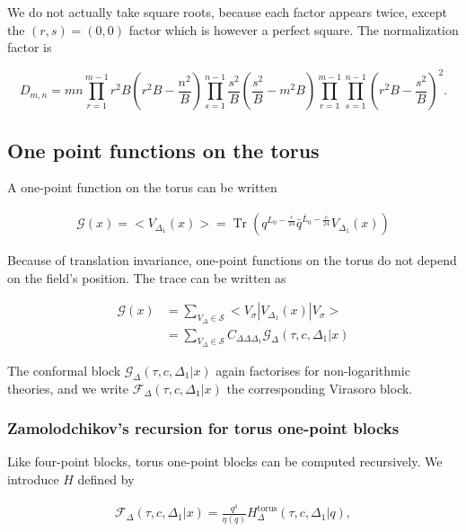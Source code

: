 \documentclass[a4paper]{article}
\numberwithin{equation}{section}
\begin{document}
We do not actually take square roots, because each factor appears twice, except the \((r,s)=(0,0)\) factor which is however a perfect square. The normalization factor is

\begin{equation}
\label{Dmn}
D_{m,n} = mn \prod_{r=1}^{m-1} r^2B \left(r^2B - \frac{n^2}{B}\right)
\prod_{s=1}^{n-1} \frac{s^2}{B}\left(\frac{s^2}{B} - m^2B\right)
\prod_{r=1}^{m-1} \prod_{s=1}^{n-1} \left(r^2B -\frac{s^2}{B} \right)^2.
\end{equation}
\subsection{One point functions on the torus}
\label{sec:orge665de3}

A one-point function on the torus can be written

\begin{align}
 \mathcal G(x) = <V_{\Delta_1}(x)> = \operatorname{Tr} (q^{L_0-\frac{c}{24}} \bar q^{\bar L_{0}-\frac{c}{24}} V_{\Delta_{1}}(x))
\end{align}

Because of translation invariance, one-point functions on the torus do not depend on the field's position. The trace can be written as

\begin{align}
  \mathcal G(x) &= \sum_{V_{\Delta} \in \mathcal S} < V_{\sigma} | V_{\Delta_{1}}(x) |V_{\sigma}> \\
                   &= \sum_{V_{\Delta} \in \mathcal S} C_{\Delta \Delta \Delta_{1}} \mathcal G_{\Delta} (\tau, c, \Delta_{1} | x)
\end{align}

The conformal block \(\mathcal G_\Delta(\tau, c, \Delta_1|x)\) again factorises for non-logarithmic theories, and we write \(\mathcal F_\Delta(\tau, c, \Delta_1 | x)\) the corresponding Virasoro block.
\subsubsection*{Zamolodchikov's recursion for torus one-point blocks}
\label{sec:orgcd94007}

Like four-point blocks, torus one-point blocks can be computed recursively. We introduce \(H\) defined by

\begin{align}
  \mathcal F_{\Delta}(\tau, c, \Delta_{1} | x) = \frac{q^{\delta}}{\eta(q)} H^{\text{torus}}_{\Delta}(\tau, c, \Delta_{1} | q),
\end{align}
\end{document}
